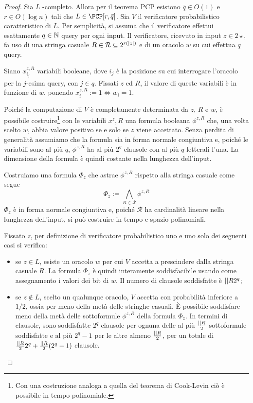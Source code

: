 \begin{proof}
	\newcommand{\Rand}{\mathcal R}
	Sia $L$ \NP-completo. Allora per il teorema PCP esistono $\bar q\in O(1)$ e $r\in O(\log n)$ tali che $L\in\PCP[r,\bar q]$.
	Sia $V$ il verificatore probabilistico caratteristico di $L$.
	Per semplicità, si assuma che il verificatore effettui esattamente $q\in\mathbb N$ query per ogni input.
	Il verificatore, ricevuto in input $z\in 2\star$, fa uso di una stringa casuale $R\in\Rand\subseteq 2^{r(\len z)}$ e di un oracolo $w$ su cui effettua $q$ query.

	Siano $x^{z,R}_{i_j}$ variabili booleane, dove $i_j$ è la posizione su cui interrogare l'oracolo per la $j$-esima query, con $j\in q$.
	Fissati $z$ ed $R$, il valore di queste variabili è in funzione di $w$, ponendo $x^{z,R}_i:=1\iff w_i=1$.

	Poiché la computazione di $V$ è completamente determinata da $z$, $R$ e $w$, è possibile costruire\footnote{Con una costruzione analoga a quella del teorema di Cook-Levin ciò è possibile in tempo polinomiale.} con le variabili $x^z,R$ una formula booleana $\phi^{z,R}$ che, una volta scelto $w$, abbia valore positivo se e solo se $z$ viene accettato.
	Senza perdita di generalità assumiamo che la formula sia in forma normale congiuntiva e, poiché le variabili sono al più $q$, $\phi^{z,R}$ ha al più $2^q$ clausole con al più $q$ letterali l'una. La dimensione della formula è quindi costante nella lunghezza dell'input.

	Costruiamo una formula $\Phi_z$ che astrae $\phi^{z,R}$ rispetto alla stringa casuale come segue
	\begin{equation*}
		\Phi_z := \bigwedge_{R\in\Rand} \phi^{z,R}
	\end{equation*}
	$\Phi_z$ è in forma normale congiuntiva e, poiché $\Rand$ ha cardinalità lineare nella lunghezza dell'input, si può costruire in tempo e spazio polinomiali.

	Fissato $z$, per definizione di verificatore probabilistico uno e uno solo dei seguenti casi si verifica:
	\begin{itemize}
		\item se $z\in L$, esiste un oracolo $w$ per cui $V$ accetta a prescindere dalla stringa casuale $R$. La formula $\Phi_z$ è quindi interamente soddisfacibile usando come assegnamento i valori dei bit di $w$. Il numero di clausole soddisfatte è $\card\Rand 2^q$;
		\item se $z\notin L$, scelto un qualunque oracolo, $V$ accetta con probabilità inferiore a $1/2$, ossia per meno della metà delle stringhe casuali. È possibile soddisfare meno della metà delle sottoformule $\phi^{z,R}$ della formula $\Phi_z$. In termini di clausole, sono soddisfatte $2^q$ clausole per ognuna delle al più $\frac{\card\Rand}{2}$ sottoformule soddisfatte e al più $2^q-1$ per le altre almeno $\frac{\card\Rand}{2}$, per un totale di $\frac{\card\Rand}{2}2^q+\frac{\card\Rand}{2}(2^q-1)$ clausole.
	\end{itemize}


\end{proof}
